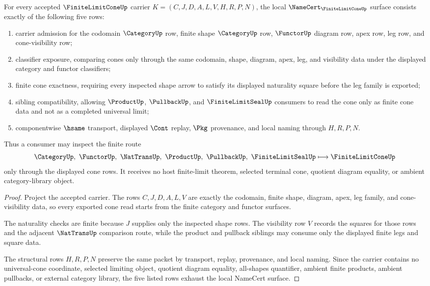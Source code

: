 \begin{theorem}
\label{thm:finite-limit-cone-namecert-obligations}
For every accepted $\FiniteLimitConeUp$ carrier $K=(C,J,D,A,L,V,H,R,P,N)$, the local $\NameCert_{\FiniteLimitConeUp}$ surface consists exactly of the following five rows:
\begin{enumerate}
\item carrier admission for the codomain $\CategoryUp$ row, finite shape $\CategoryUp$ row, $\FunctorUp$ diagram row, apex row, leg row, and cone-visibility row;
\item classifier exposure, comparing cones only through the same codomain, shape, diagram, apex, leg, and visibility data under the displayed category and functor classifiers;
\item finite cone exactness, requiring every inspected shape arrow to satisfy its displayed naturality square before the leg family is exported;
\item sibling compatibility, allowing $\ProductUp$, $\PullbackUp$, and $\FiniteLimitSealUp$ consumers to read the cone only as finite cone data and not as a completed universal limit;
\item componentwise $\hsame$ transport, displayed $\Cont$ replay, $\Pkg$ provenance, and local naming through $H,R,P,N$.
\end{enumerate}
Thus a consumer may inspect the finite route
$$
\CategoryUp,\ \FunctorUp,\ \NatTransUp,\ \ProductUp,\ \PullbackUp,\ \FiniteLimitSealUp
\longmapsto
\FiniteLimitConeUp
$$
only through the displayed cone rows. It receives no host finite-limit theorem, selected terminal cone, quotient diagram equality, or ambient category-library object.
\end{theorem}
\begin{proof}
Project the accepted carrier. The rows $C,J,D,A,L,V$ are exactly the codomain, finite shape, diagram, apex, leg family, and cone-visibility data, so every exported cone read starts from the finite category and functor surfaces.

The naturality checks are finite because $J$ supplies only the inspected shape rows. The visibility row $V$ records the squares for those rows and the adjacent $\NatTransUp$ comparison route, while the product and pullback siblings may consume only the displayed finite legs and square data.

The structural rows $H,R,P,N$ preserve the same packet by transport, replay, provenance, and local naming. Since the carrier contains no universal-cone coordinate, selected limiting object, quotient diagram equality, all-shapes quantifier, ambient finite products, ambient pullbacks, or external category library, the five listed rows exhaust the local NameCert surface.
\end{proof}

